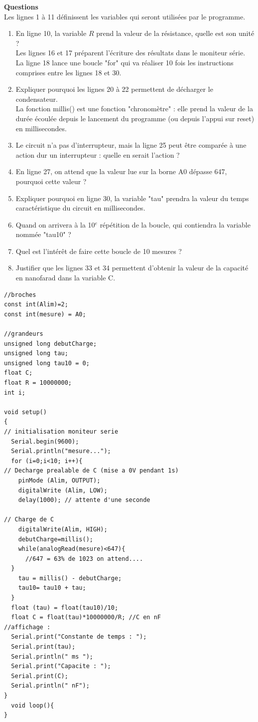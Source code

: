 \documentclass[a4paper,11pt,fleqn]{scrartcl}%
\begin{document}
\textbf{Questions}\\
	Les lignes 1 à 11 définissent les variables qui seront utilisées par le programme.
	\begin{enumerate}
		\item En ligne 10, la variable $R$ prend la valeur de la résistance, quelle est son unité ?\\
		Les lignes 16 et 17 préparent l'écriture des résultats dans le moniteur série.\\
		La ligne 18 lance une boucle "for" qui va réaliser 10 fois les instructions comprises entre les lignes 18 et 30.
		\item Expliquer pourquoi les lignes 20 à 22 permettent de décharger le condensateur.\\
		La fonction millis() est une fonction "chronomètre" : elle prend la valeur de la durée écoulée depuis le lancement du programme (ou depuis l'appui sur reset) en millisecondes.
		\item Le circuit n'a pas d'interrupteur, mais la ligne 25 peut être comparée à une action dur un interrupteur : quelle en serait l'action ?
		\item En ligne 27, on attend que la valeur lue sur la borne A0 dépasse 647, pourquoi cette valeur ?
		\item Expliquer pourquoi en ligne 30, la variable "tau" prendra la valeur du temps caractéristique du circuit en millisecondes.
		\item Quand on arrivera à la 10$^e$ répétition de la boucle, qui contiendra la variable nommée "tau10" ?
		\item Quel est l'intérêt de faire cette boucle de 10 mesures ?
		\item Justifier que les lignes 33 et 34 permettent d'obtenir la valeur de la capacité en nanofarad dans la variable C.
	\end{enumerate}

\begin{minipage}{.7\linewidth}
	\begin{lstlisting}[style=Arduino]
//broches
const int(Alim)=2;
const int(mesure) = A0;

//grandeurs
unsigned long debutCharge;
unsigned long tau;
unsigned long tau10 = 0;
float C;
float R = 10000000;
int i;

void setup()
{
// initialisation moniteur serie
  Serial.begin(9600);
  Serial.println("mesure...");
  for (i=0;i<10; i++){
// Decharge prealable de C (mise a 0V pendant 1s)
    pinMode (Alim, OUTPUT);
    digitalWrite (Alim, LOW);
    delay(1000); // attente d'une seconde
    
// Charge de C
    digitalWrite(Alim, HIGH);
    debutCharge=millis();
    while(analogRead(mesure)<647){
      //647 = 63% de 1023 on attend....
  }
    tau = millis() - debutCharge;
    tau10= tau10 + tau;
  }
  float (tau) = float(tau10)/10;
  float C = float(tau)*10000000/R; //C en nF
//affichage :
  Serial.print("Constante de temps : ");
  Serial.print(tau);
  Serial.println(" ms ");
  Serial.print("Capacite : ");
  Serial.print(C);
  Serial.println(" nF");
}
  void loop(){
}
	\end{lstlisting}
\end{minipage}
\end{document}
